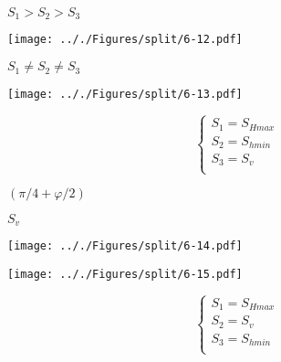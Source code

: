 \documentclass[onecolumn,11pt]{report}
\def\lthtmlcheckvsize{\ifdim\ht\sizebox<\vsize 
  \ifdim\wd\sizebox<\hsize\expandafter\hfill\fi \expandafter\vfill
  \else\expandafter\vss\fi}%
\begin{document}
{\newpage\clearpage
{}%
$ S_1 > S_2 > S_3$%
\lthtmlindisplaymathZ
\lthtmlcheckvsize\clearpage}

{\newpage\clearpage
{}%
\texttt{[image: .././Figures/split/6-12.pdf]}%
\lthtmlpictureZ
\lthtmlcheckvsize\clearpage}

{\newpage\clearpage
{}%
$ S_1 \neq S_2 \neq S_3$%
\lthtmlindisplaymathZ
\lthtmlcheckvsize\clearpage}

{\newpage\clearpage
{}%
\texttt{[image: .././Figures/split/6-13.pdf]}%
\lthtmlpictureZ
\lthtmlcheckvsize\clearpage}

{\newpage\clearpage
{}%
\begin{displaymath}\left\lbrace
\begin{array}{l}
S_1 = S_{Hmax} \\
S_2 = S_{hmin} \\
S_3 = S_v \\
\end{array}
\right.\end{displaymath}%
\lthtmldisplayZ
\lthtmlcheckvsize\clearpage}

{\newpage\clearpage
{}%
$ (\pi/4 + \varphi/2)$%
\lthtmlindisplaymathZ
\lthtmlcheckvsize\clearpage}

{\newpage\clearpage
{}%
$ S_{v}$%
\lthtmlindisplaymathZ
\lthtmlcheckvsize\clearpage}

{\newpage\clearpage
{}%
\texttt{[image: .././Figures/split/6-14.pdf]}%
\lthtmlpictureZ
\lthtmlcheckvsize\clearpage}

{\newpage\clearpage
{}%
\texttt{[image: .././Figures/split/6-15.pdf]}%
\lthtmlpictureZ
\lthtmlcheckvsize\clearpage}

{\newpage\clearpage
{}%
\begin{displaymath}\left\lbrace
\begin{array}{l}
S_1 = S_{Hmax} \\
S_2 = S_v \\
S_3 = S_{hmin} \\
\end{array}
\right.\end{displaymath}%
\lthtmldisplayZ
\lthtmlcheckvsize\clearpage}
\end{document}
